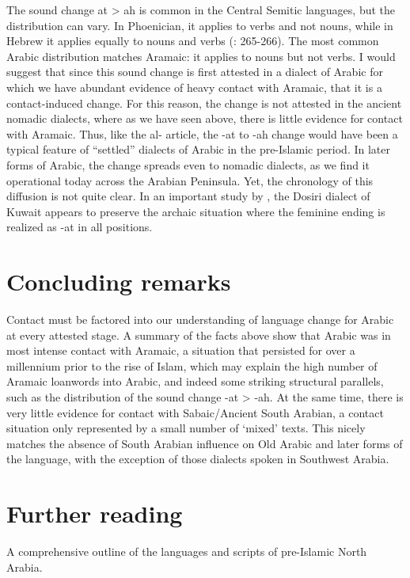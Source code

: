 \documentclass[output=paper]{langsci/langscibook}
\begin{document}
The sound change at > ah is common in the Central Semitic languages, but the distribution can vary. In Phoenician, it applies to verbs and not nouns, while in Hebrew it applies equally to nouns and verbs (\citet{Huehnergard & Rubin 2011}: 265-266). The most common Arabic distribution matches Aramaic: it applies to nouns but not verbs. I would suggest that since this sound change is first attested in a dialect of Arabic for which we have abundant evidence of heavy contact with Aramaic, that it is a contact-induced change. For this reason, the change is not attested in the ancient nomadic dialects, where as we have seen above, there is little evidence for contact with Aramaic. Thus, like the al- article, the -at to -ah change would have been a typical feature of “settled” dialects of Arabic in the pre-Islamic period. In later forms of Arabic, the change spreads even to nomadic dialects, as we find it operational today across the Arabian Peninsula. Yet, the chronology of this diffusion is not quite clear. In an important study by \citet{vanPutten2018}, the Dosiri dialect of Kuwait appears to preserve the archaic situation where the feminine ending is realized as -at in all positions.

\section{Concluding remarks}
Contact must be factored into our understanding of language change for Arabic at every attested stage. A summary of the facts above show that Arabic was in most intense contact with Aramaic, a situation that persisted for over a millennium prior to the rise of Islam, which may explain the high number of Aramaic loanwords into Arabic, and indeed some striking structural parallels, such as the distribution of the sound change -at > -ah. At the same time, there is very little evidence for contact with Sabaic/Ancient South Arabian, a contact situation only represented by a small number of ‘mixed’ texts.  This nicely matches the absence of South Arabian influence on Old Arabic and later forms of the language, with the exception of those dialects spoken in Southwest Arabia.

\section*{Further reading}
\citet{Al-Jallad2018ANA} A comprehensive outline of the languages and scripts of pre-Islamic North Arabia.\\
\end{document}
